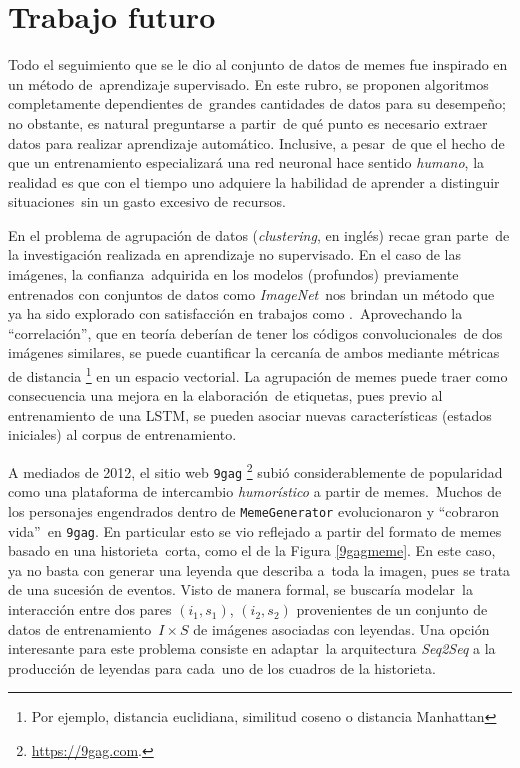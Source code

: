 \section{Trabajo futuro}

\noindent
Todo el seguimiento que se le dio al conjunto de datos de memes fue inspirado en un método de\
aprendizaje supervisado. En este rubro, se proponen algoritmos completamente dependientes de\
grandes cantidades de datos para su desempeño; no obstante, es natural preguntarse a partir\
de qué punto es necesario extraer datos para realizar aprendizaje automático. Inclusive, a pesar\
de que el hecho de que un entrenamiento especializará una red neuronal hace sentido \emph{humano},
la realidad es que con el tiempo uno adquiere la habilidad de aprender a distinguir situaciones\
sin un gasto excesivo de recursos.\par
En el problema de agrupación de datos (\emph{clustering}, en inglés) recae gran parte\
de la investigación realizada en aprendizaje no supervisado. En el caso de las imágenes, la confianza\
adquirida en los modelos (profundos) previamente entrenados con conjuntos de datos como \emph{ImageNet}\
nos brindan un método que ya ha sido explorado con satisfacción en trabajos como \cite{DBLP:journals/corr/DundarJC15}.\
Aprovechando la ``correlación'', que en teoría deberían de tener los códigos convolucionales\
de dos imágenes similares, se puede cuantificar la cercanía de ambos mediante métricas de distancia%
\footnote{
  Por ejemplo, distancia euclidiana, similitud coseno o distancia Manhattan
} en un espacio vectorial. La agrupación de memes puede traer como consecuencia una mejora en la elaboración\
de etiquetas, pues previo al entrenamiento de una LSTM, se pueden asociar nuevas características (estados iniciales)
al corpus de entrenamiento.\par
A mediados de 2012, el sitio web \verb+9gag+%
\footnote{
  \url{https://9gag.com}.
} subió considerablemente de popularidad como una plataforma de intercambio \emph{humorístico} a partir de memes.\
Muchos de los personajes engendrados dentro de \verb+MemeGenerator+ evolucionaron y ``cobraron vida''\
en \verb+9gag+. En particular esto se vio reflejado a partir del formato de memes basado en una historieta\
corta, como el de la Figura \ref{9gagmeme}. En este caso, ya no basta con generar una leyenda que describa a\
toda la imagen, pues se trata de una sucesión de eventos. Visto de manera formal, se buscaría modelar\
la interacción entre dos pares $(i_1, s_1)$, $(i_2, s_2)$ provenientes de un conjunto de datos de entrenamiento\
$I \times S$ de imágenes asociadas con leyendas. Una opción interesante para este problema consiste en adaptar\
la arquitectura \emph{Seq2Seq} \cite{DBLP:journals/corr/SutskeverVL14} a la producción de leyendas para cada\
uno de los cuadros de la historieta.

